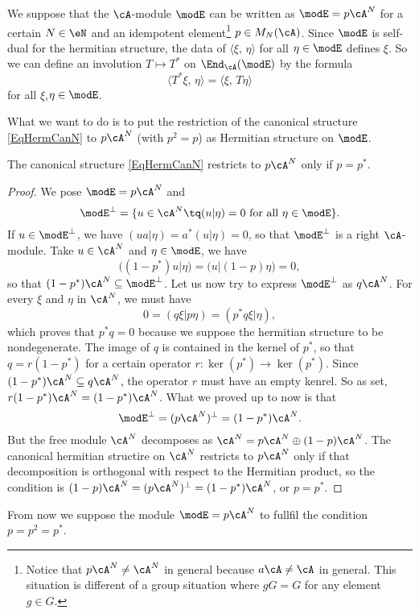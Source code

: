We suppose that the $\cA$-module $\modE$ can be written as $\modE=p\cA^N$ for a certain $N\in \eN$ and an idempotent element\footnote{Notice that $p\cA^N\neq\cA^N$ in general because $a\cA\neq\cA$ in general. This situation is different of a group situation where $gG=G$ for any element $g\in G$.} $p\in M_N(\cA)$. Since $\modE$ is self-dual for the hermitian structure, the data of $\langle \xi,\,\eta\rangle$ for all $\eta\in\modE$ defines $\xi$. So we can define an involution $T\mapsto T^*$ on $\End_{\cA}(\modE)$ by the formula
\[
	\langle T^*\xi,\,\eta\rangle=\langle \xi,\,T\eta\rangle
\]
for all $\xi$,$\eta\in\modE$.

What we want to do is to put the restriction of the canonical structure \eqref{EqHermCanN} to $p\cA^N$ (with $p^2=p$) as Hermitian structure on $\modE$.

\begin{proposition}
	The canonical structure \eqref{EqHermCanN} restricts to $p\cA^N$ only if $p=p^*$.
\end{proposition}

\begin{proof}
	We pose $\modE=p\cA^N$ and
	\[
		\modE^{\perp}=\{ u\in\cA^N\tq (u|\eta)=0\text{ for all }\eta\in\modE \}.
	\]
	If $u\in\modE^{\perp}$, we have $(ua|\eta)=a^*(u|\eta)=0$, so that $\modE^{\perp}$ is a right $\cA$-module. Take $u\in\cA^N$ and $\eta\in\modE$, we have
	\[
		\big( (1-p^*)u | \eta\big) =\big( u | (1-p)\eta\big) =0,
	\]
	so that $(1-p^*)\cA^N\subseteq\modE^{\perp}$. Let us now try to express $\modE^{\perp}$ as $q\cA^N$. For every $\xi$ and $\eta$ in $\cA^N$, we must have
	\[
		0=( q\xi | p\eta) =( p^*q\xi | \eta),
	\]
	which proves that $p^*q=0$ because we suppose the hermitian structure to be nondegenerate. The image of $q$ is contained in the kernel of $p^*$, so that $q=r(1-p^*)$ for a certain operator $r\colon \ker(p^*)\to \ker(p^*)$. Since $(1-p^*)\cA^N\subseteq q\cA^N$, the operator $r$ must have an empty kenrel. So as set, $r(1-p^*)\cA^N=(1-p^*)\cA^N$. What we proved up to now is that
	\[
		\modE^{\perp}=(p\cA^N)^{\perp}=(1-p^*)\cA^N.
	\]
	But the free module $\cA^N$ decomposes as $\cA^N=p\cA^N\oplus (1-p)\cA^N$. The canonical hermitian structire on $\cA^N$ restricts to $p\cA^N$ only if that decomposition is orthogonal with respect to the Hermitian product, so the condition is $(1-p)\cA^N=(p\cA^N)^{\perp}=(1-p^*)\cA^N$, or $p=p^*$.
\end{proof}

From now we suppose the module $\modE=p\cA^N$ to fullfil the condition $p=p^2=p^*$.

